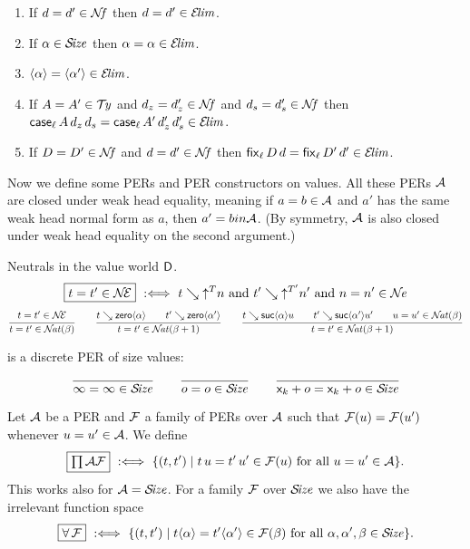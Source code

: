 \documentclass[acmlarge,review,anonymous]{acmart}\settopmatter{printfolios=true}
\begin{document}
\begin{lemma}
  \label{lem:closelim}
  \bla
  \begin{enumerate}
  \item If\/ $d = d' \in \NF$ then $d = d' \in \ELIM$.
  \item If\/ $\alpha \in \SIZE$ then $\alpha = \alpha \in \ELIM$.
  \item $\ann \alpha = \ann{\alpha'} \in \ELIM$.
  \item If\/ $A = A' \in \TY$ and $d_z = d_z' \in \NF$ and $d_s = d_s' \in \NF$
        then $\case[\ell] A {d_z}{d_s} = \case[\ell]{A'}{d_z'}{d_s'} \in \ELIM$.
  \item If\/ $D = D' \in \NF$ and $d = d' \in \NF$ then $\fix[\ell] D d = \fix[\ell]{D'}{d'} \in \ELIM$.
  \end{enumerate}
\end{lemma}

Now we define some PERs and PER constructors on values.  All these PERs $\A$ are closed under weak head equality, meaning if $a = b \in \A$ and $a'$ has the same weak head normal form as $a$, then $a' = b in \A$.  (By symmetry, $\A$ is also closed under weak head equality on the second argument.)

Neutrals in the value world $\D$.
\[
\fbox{$t = t' \in \NEE$} \defas
  t \evalsto \up T n \mand t' \evalsto \up{T'}{n'} \mand
  n = n' \in \NE
\]
\fbox{$\NAT(\alpha)$}
\begin{gather*}
  \ru{%
      t = t' \in \NEE
    }{t = t' \in \NAT(\beta)}
\qquad
  \ru{t \evalsto \zero \alpha \qquad
      t' \evalsto \zero{\alpha'}
    }{t = t' \in \NAT(\beta+1)}
\qquad
  \ru{t \evalsto \suc \alpha u \qquad
      t' \evalsto \suc {\alpha'} {u'} \qquad
      u = u' \in \NAT(\beta)
    }{t = t' \in \NAT(\beta+1)}
\end{gather*}

\fbox{$\SIZE$} is a discrete PER of size values:
\begin{gather*}
  \ru{
    }{\infty = \infty \in \SIZE}
\qquad
  \ru{
    }{o = o \in \SIZE}
\qquad
  \ru{
    }{\lev k + o = \lev k + o \in \SIZE}
\end{gather*}

Let $\A$ be a PER and $\F$ a family of PERs over $\A$ such that
$\F(u) = \F(u')$ whenever $u = u' \in \A$.  We define
\[
  \fbox{$\PIAF$} \defas \{(t,t') \mid t\,u = t'\,u' \in \F(u) \mforall u = u' \in \A \}
  .
\]
This works also for $\A = \SIZE$.
For a family $\F$ over $\SIZE$ we also have the irrelevant function space
\[
  \fbox{$\FORALL\,\F$} \defas
  \{(t,t') \mid t \ann \alpha = t' \ann{\alpha'} \in \F(\beta) \mforall \alpha,\alpha',\beta \in \SIZE \}
  .
\]
\end{document}
